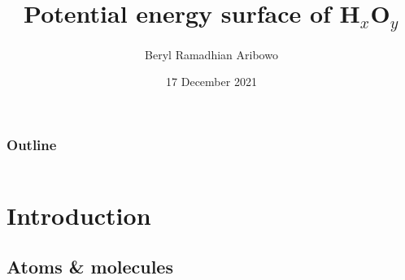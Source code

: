 \documentclass{beamer}
\title{Potential energy surface of H$_x$O$_y$}
\author[Aribowo, Neumaier] %
{Beryl Ramadhian Aribowo}
\institute[VFM] %
{
    Supervised by Prof. Arnold Neumaier\\
    Faculty of Mathematics\\
    University of Vienna
}
\date{17 December 2021}
\begin{document}
\frame{\titlepage}

\begin{frame}
    \frametitle{Outline}
    \begin{columns}[t]
        \begin{column}{.5\textwidth}
            \tableofcontents[sections={1-2}]
        \end{column}
        \begin{column}{.5\textwidth}
            \tableofcontents[sections={3-5}]
        \end{column}
    \end{columns}
\end{frame}


\section{Introduction}
\subsection{Atoms \& molecules}

\end{document}
